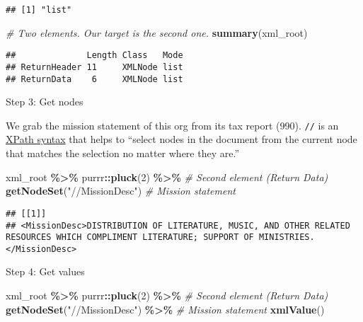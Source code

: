 \documentclass[
]{book}
\newenvironment{Shaded}{\begin{snugshade}}{\end{snugshade}}
\newcommand{\CommentTok}[1]{\textcolor[rgb]{0.56,0.35,0.01}{\textit{#1}}}
\newcommand{\DecValTok}[1]{\textcolor[rgb]{0.00,0.00,0.81}{#1}}
\newcommand{\KeywordTok}[1]{\textcolor[rgb]{0.13,0.29,0.53}{\textbf{#1}}}
\newcommand{\NormalTok}[1]{#1}
\newcommand{\OperatorTok}[1]{\textcolor[rgb]{0.81,0.36,0.00}{\textbf{#1}}}
\newcommand{\StringTok}[1]{\textcolor[rgb]{0.31,0.60,0.02}{#1}}
\begin{document}
\begin{verbatim}
## [1] "list"
\end{verbatim}

\begin{Shaded}
\begin{Highlighting}[]
\CommentTok{\# Two elements. Our target is the second one.}
\KeywordTok{summary}\NormalTok{(xml\_root)}
\end{Highlighting}
\end{Shaded}

\begin{verbatim}
##              Length Class   Mode
## ReturnHeader 11     XMLNode list
## ReturnData    6     XMLNode list
\end{verbatim}

Step 3: Get nodes

We grab the mission statement of this org from its tax report (990). \texttt{//} is an \href{https://www.w3schools.com/xml/xpath_syntax.asp}{XPath syntax} that helps to ``select nodes in the document from the current node that matches the selection no matter where they are.''

\begin{Shaded}
\begin{Highlighting}[]
\NormalTok{xml\_root }\OperatorTok{\%\textgreater{}\%}
\StringTok{  }\NormalTok{purrr}\OperatorTok{::}\KeywordTok{pluck}\NormalTok{(}\DecValTok{2}\NormalTok{) }\OperatorTok{\%\textgreater{}\%}\StringTok{ }\CommentTok{\# Second element (Return Data)}
\StringTok{  }\KeywordTok{getNodeSet}\NormalTok{(}\StringTok{"//MissionDesc"}\NormalTok{) }\CommentTok{\# Mission statement }
\end{Highlighting}
\end{Shaded}

\begin{verbatim}
## [[1]]
## <MissionDesc>DISTRIBUTION OF LITERATURE, MUSIC, AND OTHER RELATED RESOURCES WHICH COMPLIMENT LITERATURE; SUPPORT OF MINISTRIES.</MissionDesc>
\end{verbatim}

Step 4: Get values

\begin{Shaded}
\begin{Highlighting}[]
\NormalTok{xml\_root }\OperatorTok{\%\textgreater{}\%}
\StringTok{  }\NormalTok{purrr}\OperatorTok{::}\KeywordTok{pluck}\NormalTok{(}\DecValTok{2}\NormalTok{) }\OperatorTok{\%\textgreater{}\%}\StringTok{ }\CommentTok{\# Second element (Return Data)}
\StringTok{  }\KeywordTok{getNodeSet}\NormalTok{(}\StringTok{"//MissionDesc"}\NormalTok{) }\OperatorTok{\%\textgreater{}\%}\StringTok{ }\CommentTok{\# Mission statement }
\StringTok{  }\KeywordTok{xmlValue}\NormalTok{()}
\end{Highlighting}
\end{Shaded}
\end{document}
